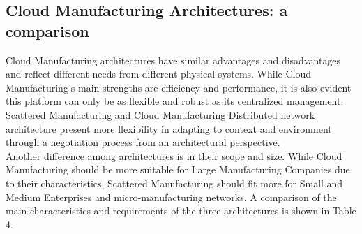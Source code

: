 \subsection{Cloud Manufacturing Architectures: a comparison}
Cloud Manufacturing architectures have similar advantages and disadvantages and reflect different needs from different physical systems. While Cloud Manufacturing's main strengths are efficiency and performance, it is also evident this platform can only be as flexible and robust as its centralized management. Scattered Manufacturing and Cloud Manufacturing Distributed network architecture present more flexibility in adapting to context and environment through a negotiation process from an architectural perspective.\\
Another difference among architectures is in their scope and size. While Cloud Manufacturing should be more suitable for Large Manufacturing Companies due to their characteristics, Scattered Manufacturing should fit more for Small and Medium Enterprises and micro-manufacturing networks. A comparison of the main characteristics and requirements of the three architectures is shown in Table 4.

